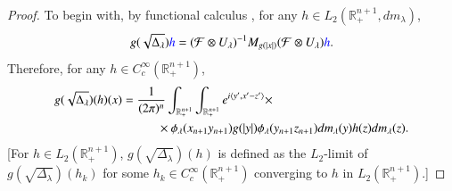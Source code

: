 \documentclass[12pt]{amsart}
\begin{document}
\begin{proof} To begin with, by functional calculus \cite{MR617913}, {\color{blue}for any $h\in L_2(\mathbb{R}_+^{n+1},dm_\lambda)$,}
$$g(\sqrt{\Delta_{\lambda}}){\color{blue}h}=(\mathcal{F}\otimes U_{\lambda})^{-1}M_{g(|x|)}(\mathcal{F}\otimes U_{\lambda}){\color{blue}h}.$$
Therefore, {\color{blue}for any $h\in C_c^\infty(\mathbb{R}_+^{n+1})$,}
\begin{align*}
g(\sqrt{\Delta_{\lambda}})(h)(x)&=\frac{1}{(2\pi)^n}\int_{\mathbb{R}_+^{n+1}}\int_{\mathbb{R}_+^{n+1}}e^{i\langle y',x'-z'\rangle}\times\\
&\hspace{1.0cm}\times\phi_\lambda(x_{n+1}y_{n+1})g(|y|)\phi_\lambda(y_{n+1}z_{n+1})dm_\lambda(y)h(z)dm_\lambda(z).
\end{align*}
{\color{red}[For $h\in L_2(\mathbb{R}_+^{n+1})$, $g(\sqrt{\Delta_{\lambda}})(h)$ is defined as the $L_2$-limit of $g(\sqrt{\Delta_{\lambda}})(h_k)$ for some $h_k\in C_c^\infty(\mathbb{R}_+^{n+1})$ converging to $h$ in $L_2(\mathbb{R}_+^{n+1})$.]}


\end{proof}
\end{document}
